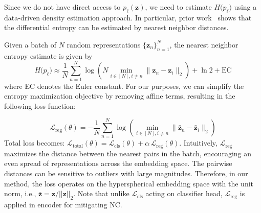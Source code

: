 
Since we do not have direct access to $p_\ell(\mathbf{z})$, we need to estimate $H\bigl(p_\ell\bigr)$ using a data-driven density estimation approach. %
In particular, prior work~\cite{kozachenko1987sample, beirlant1997nonparametric} shows that the differential entropy can be estimated by nearest neighbor distances.

Given a batch of \( N \) random representations \( \{\mathbf{z}_n\}_{n=1}^N \), the nearest neighbor entropy estimate is given by
\begin{equation*}
    H\bigl(p_\ell\bigr) \approx \frac{1}{N} \sum_{n=1}^N \log \left( N \min_{i \in [N], i \neq n} \| \mathbf{z}_n - \mathbf{z}_i \|_2 \right) + \ln 2 + \text{EC}
\end{equation*}
where EC denotes the Euler constant. For our purposes, we can simplify the entropy maximization objective by removing affine terms, resulting in the following loss function:

\begin{equation*}
    \mathcal{L}_{\mathrm{reg}}(\theta) = -\frac{1}{N} \sum_{n=1}^N \log \left( \min_{i \in [N], i \neq n} \| \bar{\mathbf{z}}_n - \bar{\mathbf{z}}_i \|_2 \right)
\end{equation*}
Total loss becomes: $\mathcal{L}_{\mathrm{total}}(\theta) = \mathcal{L}_{\mathrm{cls}}(\theta) + \alpha \, \mathcal{L}_{\mathrm{reg}}(\theta)$.
Intuitively, $\mathcal{L}_{\mathrm{reg}}$ maximizes the distance between the nearest pairs in the batch, encouraging an even spread of representations across the embedding space.
The pairwise distances can be sensitive to outliers with large magnitudes. Therefore, in our method, the loss operates on the hyperspherical embedding space with the unit norm, i.e., \( \bar{\mathbf{z}} = \mathbf{z} / ||\mathbf{z}||_2 \). Note that unlike $\mathcal{L}_{\mathrm{cls}}$ acting on classifier head, $\mathcal{L}_{\mathrm{reg}}$ is applied in encoder for mitigating NC. 

